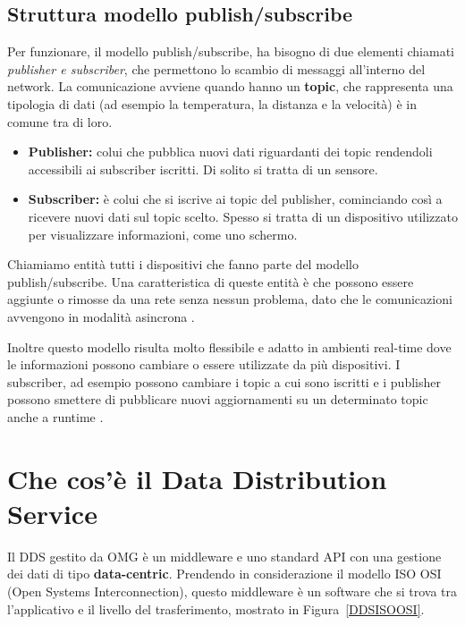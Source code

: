 \subsection{Struttura modello publish/subscribe}
Per funzionare, il modello publish/subscribe, ha bisogno di
due elementi chiamati \textit{publisher e subscriber}, 
che permettono lo scambio di messaggi all'interno del network.
La comunicazione avviene 
quando hanno un \textbf{topic}, che
rappresenta una tipologia di dati (ad esempio la temperatura, 
la distanza e la velocità) è in comune tra di loro.
\begin{itemize}
    \item \textbf{Publisher:} colui che pubblica nuovi dati riguardanti dei
    topic rendendoli accessibili ai subscriber iscritti. 
    Di solito si tratta di un sensore.
    \item \textbf{Subscriber:} è colui che si iscrive ai topic del publisher, 
    cominciando
    così a ricevere nuovi dati sul topic scelto. Spesso si tratta
    di un dispositivo utilizzato per visualizzare informazioni, come uno
    schermo.
\end{itemize}
Chiamiamo entità tutti i dispositivi che fanno parte del modello 
publish/subscribe.
Una caratteristica di queste entità è che possono essere aggiunte o rimosse
da una rete senza nessun problema, dato che le 
comunicazioni avvengono in modalità asincrona \cite{dds1.4}. 

Inoltre questo modello risulta molto
flessibile e adatto in ambienti real-time dove le informazioni
possono cambiare o essere utilizzate da più dispositivi.
I subscriber, ad esempio possono cambiare i topic a cui 
sono iscritti e i publisher possono smettere di pubblicare nuovi
aggiornamenti su un determinato topic anche a runtime \cite{OH2010318}.
\label{publish/subscribe}

\section{Che cos'è il Data Distribution Service}

Il DDS gestito da OMG è un middleware e uno standard API con una gestione
dei dati di tipo \textbf{data-centric}. 
Prendendo in considerazione il modello ISO OSI 
(Open Systems Interconnection), questo
middleware è un software che si trova tra l'applicativo e il livello
del trasferimento, mostrato in Figura~\ref{DDSISOOSI}.

